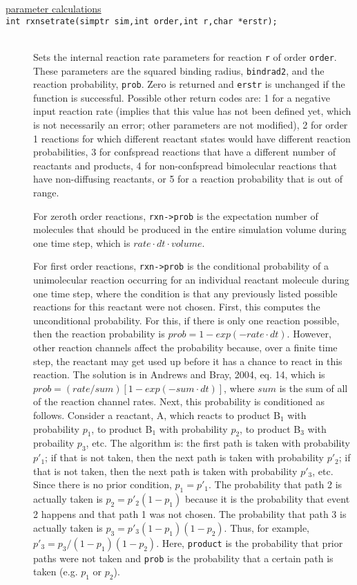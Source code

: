 \documentclass {scrbook}
\newcommand {\ttt} {\texttt}
\begin{document}
\begin{description}
\item[\underline{parameter calculations}]

\item[\ttt{int rxnsetrate(simptr sim,int order,int r,char *erstr);}]
\hfill \\
Sets the internal reaction rate parameters for reaction \ttt{r} of order \ttt{order}. These parameters are the squared binding radius, \ttt{bindrad2}, and the reaction probability, \ttt{prob}. Zero is returned and \ttt{erstr} is unchanged if the function is successful. Possible other return codes are: 1 for a negative input reaction rate (implies that this value has not been defined yet, which is not necessarily an error; other parameters are not modified), 2 for order 1 reactions for which different reactant states would have different reaction probabilities, 3 for confspread reactions that have a different number of reactants and products, 4 for non-confspread bimolecular reactions that have non-diffusing reactants, or 5 for a reaction probability that is out of range.

For zeroth order reactions, \ttt{rxn->prob} is the expectation number of molecules that should be produced in the entire simulation volume during one time step, which is $rate \cdot dt \cdot volume$.

For first order reactions, \ttt{rxn->prob} is the conditional probability of a unimolecular reaction occurring for an individual reactant molecule during one time step, where the condition is that any previously listed possible reactions for this reactant were not chosen. First, this computes the unconditional probability. For this, if there is only one reaction possible, then the reaction probability is $prob=1-exp(-rate \cdot dt)$. However, other reaction channels affect the probability because, over a finite time step, the reactant may get used up before it has a chance to react in this reaction. The solution is in Andrews and Bray, 2004, eq. 14, which is $prob=(rate/sum)[1-exp(-sum \cdot dt)]$, where $sum$ is the sum of all of the reaction channel rates. Next, this probability is conditioned as follows. Consider a reactant, A, which reacts to product B$_1$ with probability $p_{1}$, to product B$_1$ with probability $p_2$, to product B$_3$ with probaility $p_3$, etc. The algorithm is: the first path is taken with probability $p'_1$; if that is not taken, then the next path is taken with probability $p'_2$; if that is not taken, then the next path is taken with probability $p'_3$, etc. Since there is no prior condition, $p_1=p'_1$. The probability that path 2 is actually taken is $p_2=p'_{2}(1-p_1)$ because it is the probability that event 2 happens and that path 1 was not chosen. The probability that path 3 is actually taken is $p_3=p'_{3}(1-p_1)(1-p_2)$. Thus, for example, $p'_3=p_3/(1-p_1)(1-p_2)$. Here, \ttt{product} is the probability that prior paths were not taken and \ttt{prob} is the probability that a certain path is taken (e.g. $p_1$ or $p_2$).


\end{description}
\end{document}
